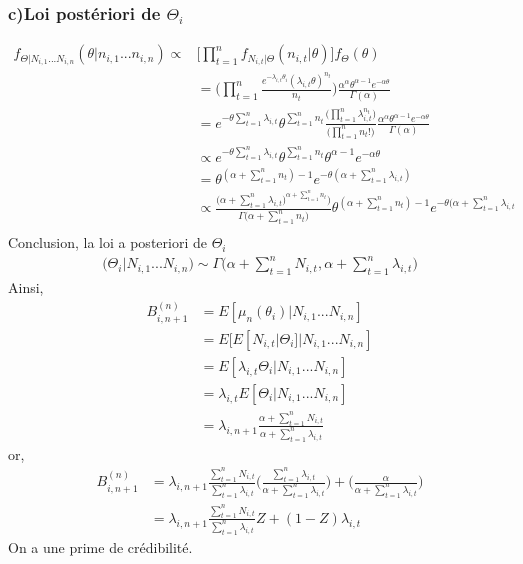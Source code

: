 \documentclass[11pt,french]{report}
\newcommand{\fact}[1]{#1\mathpunct{}!}
\begin{document}
\subsubsection*{c)Loi postériori de $\Theta_i$}
\begin{align*}
f_{\Theta|N_{i,1}...N_{i,n}}(\theta|n_{i,1}...n_{i,n}) \propto& \Bigg[ \prod_{t=1}^{n} f_{N_{i,t}|\Theta}(n_{i,t}|\theta) \Bigg] f_{\Theta}(\theta) \\
&= \Bigg(\prod_{t=1}^{n} \frac{e^{- \lambda_{i,t} \theta_i}(\lambda_{i,t}\theta)^{n_t}}{n_t} \Bigg) \frac{\alpha^{\alpha} \theta^{\alpha-1}e^{-\alpha \theta}}{\Gamma(\alpha)} \\
&= e^{-\theta \sum_{t=1}^{n}\lambda_{i,t}} \theta^{\sum_{t=1}^{n}n_t} \frac{\Big( \prod_{t=1}^{n} \lambda_{i,t}^{n_t} \Big)}{\Big( \prod_{t=1}^{n} \fact{n_t} \Big)}\frac{\alpha^{\alpha} \theta^{\alpha-1}e^{-\alpha \theta}}{\Gamma(\alpha)} \\
&\propto e^{-\theta \sum_{t=1}^{n}\lambda_{i,t}} \theta^{\sum_{t=1}^{n}n_t} \theta^{\alpha-1}e^{-\alpha \theta} \\
&=  \theta^{(\alpha + \sum_{t=1}^{n}n_t) -1}e^{-\theta(\alpha + \sum_{t=1}^{n}\lambda_{i,t})}\\
&\propto \frac{\Big(\alpha + \sum_{t=1}^{n}\lambda_{i,t})^{\alpha + \sum_{t=1}^{n}n_t} \Big)}{\Gamma\bigg( \alpha + \sum_{t=1}^{n}n_t \bigg)}\theta^{(\alpha + \sum_{t=1}^{n}n_t) -1}e^{-\theta(\alpha + \sum_{t=1}^{n}\lambda_{i,t}}\\
\end{align*}
Conclusion, la loi a posteriori de $\Theta_i$
\begin{align*}
\Big(\Theta_i|N_{i,1}...N_{i,n} \Big) \sim \Gamma\Bigg(\alpha + \sum_{t=1}^{n} N_{i,t}, \alpha + \sum_{t=1}^{n}\lambda_{i,t}\Bigg)
\end{align*}
Ainsi, 
\begin{align*}
B_{i,n+1}^{(n)} &= E[\mu_n(\theta_i)|N_{i,1}...N_{i,n}] \\
&= E[E[N_{i,t}|\Theta_i]|N_{i,1}...N_{i,n}]\\
&= E[\lambda_{i,t} \Theta_i|N_{i,1}...N_{i,n}]\\
&=\lambda_{i,t} E[\Theta_i|N_{i,1}...N_{i,n}]\\
&= \lambda_{i,n+1} \frac{\alpha + \sum_{t=1}^{n} N_{i,t}}{\alpha + \sum_{t=1}^{n} \lambda_{i,t}}
\end{align*}
or, 
\begin{align*}
B_{i,n+1}^{(n)} &= \lambda_{i,n+1} \frac{\sum_{t=1}^{n} N_{i,t}}{\sum_{t=1}^{n} \lambda_{i,t}} \Bigg( \frac{\sum_{t=1}^{n} \lambda_{i,t}}{\alpha + \sum_{t=1}^{n} \lambda_{i,t}}\Bigg) + \Bigg( \frac{\alpha}{\alpha + \sum_{t=1}^{n} \lambda_{i,t}}\Bigg) \\
&= \lambda_{i,n+1} \frac{\sum_{t=1}^{n} N_{i,t}}{\sum_{t=1}^{n} \lambda_{i,t}} Z + (1 - Z) \lambda_{i,t}
\end{align*}
On a une prime de crédibilité.
\end{document}
